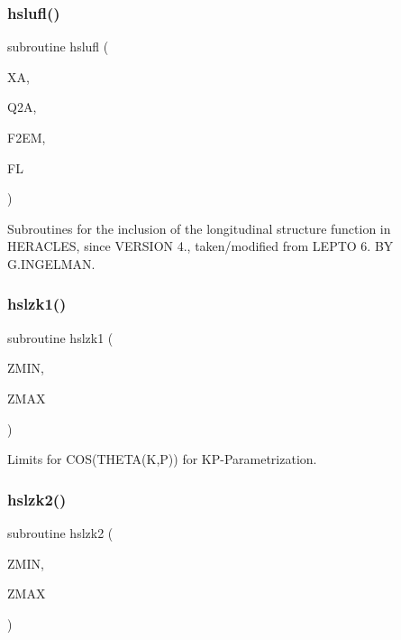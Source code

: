\subsubsection{\texorpdfstring{hslufl()}{hslufl()}}
{\footnotesize\ttfamily subroutine hslufl (\begin{DoxyParamCaption}\item[{}]{XA,  }\item[{}]{Q2A,  }\item[{}]{F2\+EM,  }\item[{}]{FL }\end{DoxyParamCaption})}



Subroutines for the inclusion of the longitudinal structure function in H\+E\+R\+A\+C\+L\+ES, since V\+E\+R\+S\+I\+ON 4., taken/modified from L\+E\+P\+TO 6. BY G.\+I\+N\+G\+E\+L\+M\+AN. 

\mbox{\label{djangoh__h_8f_aa2758c7c67c101829423ac8239b00e62}} 
\subsubsection{\texorpdfstring{hslzk1()}{hslzk1()}}
{\footnotesize\ttfamily subroutine hslzk1 (\begin{DoxyParamCaption}\item[{}]{Z\+M\+IN,  }\item[{}]{Z\+M\+AX }\end{DoxyParamCaption})}



Limits for C\+O\+S(\+T\+H\+E\+T\+A(\+K,\+P)) for K\+P-\/\+Parametrization. 

\mbox{\label{djangoh__h_8f_ac76dab3307c7242c03f4c84e184655b4}} 
\subsubsection{\texorpdfstring{hslzk2()}{hslzk2()}}
{\footnotesize\ttfamily subroutine hslzk2 (\begin{DoxyParamCaption}\item[{}]{Z\+M\+IN,  }\item[{}]{Z\+M\+AX }\end{DoxyParamCaption})}



